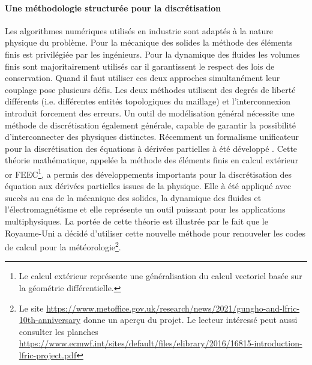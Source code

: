 \documentclass[12pt, french]{article}
\begin{document}
	\paragraph{\large Une méthodologie structurée pour la discrétisation \\}
	Les algorithmes numériques utilisés en industrie sont adaptés à la nature physique du problème. Pour la mécanique des solides la méthode des éléments finis est privilégiée par les ingénieurs. Pour la dynamique des fluides les volumes finis sont majoritairement utilisés car il garantissent le respect des lois de conservation. Quand il faut utiliser ces deux approches simultanément leur couplage pose plusieurs défis. Les deux méthodes utilisent des degrés de liberté différents (i.e. différentes entités topologiques du maillage) et l'interconnexion introduit forcement des erreurs. Un outil de modélisation général nécessite une méthode de discrétisation également générale, capable de  garantir la possibilité d'interconnecter des physiques distinctes. Récemment un formalisme unificateur pour la discrétisation des équations à dérivées partielles  à été développé  \cite{arnold2006acta}. Cette théorie mathématique, appelée la méthode des éléments finis en calcul extérieur or FEEC\footnote{Le calcul extérieur représente une généralisation du calcul vectoriel basée sur la géométrie différentielle.}, a permis des développements importants pour la discrétisation des équation aux dérivées partielles issues de la physique. Elle à été appliqué avec succès au cas de la mécanique des solides, la dynamique des fluides et l'électromagnétisme et elle représente un outil puissant pour les applications multiphysiques. La portée de cette théorie est illustrée par le fait que le Royaume-Uni a décidé d'utiliser cette nouvelle méthode pour renouveler les codes de calcul pour la météorologie\footnote{Le site \url{https://www.metoffice.gov.uk/research/news/2021/gungho-and-lfric-10th-anniversary} donne un aperçu du projet. Le lecteur intéressé peut aussi consulter les planches  \url{https://www.ecmwf.int/sites/default/files/elibrary/2016/16815-introduction-lfric-project.pdf}}.
	
\end{document}
